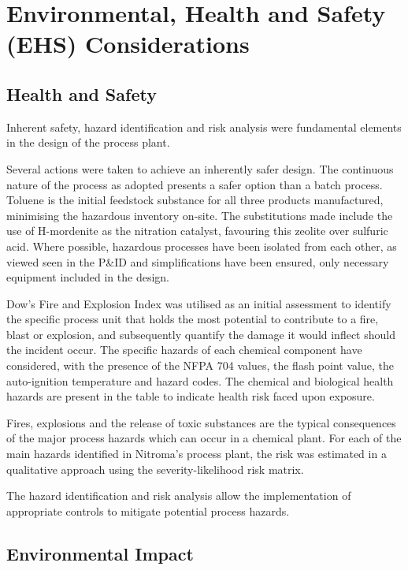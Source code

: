 \section{Environmental, Health and Safety (EHS) Considerations}
\label{sec:ehs}
\subsection{Health and Safety}

Inherent safety, hazard identification and risk analysis were fundamental elements in the design of the process plant. 

Several actions were taken to achieve an inherently safer design. The continuous nature of the process as adopted presents a safer option than a batch process. Toluene is the initial feedstock substance for all three products manufactured, minimising the hazardous inventory on-site. The substitutions made include the use of H-mordenite as the nitration catalyst, favouring this zeolite over sulfuric acid. Where possible, hazardous processes have been isolated from each other, as viewed seen in the P&ID and simplifications have been ensured, only necessary equipment included in the design. 

Dow's Fire and Explosion Index was utilised as an initial assessment to identify the specific process unit that holds the most potential to contribute to a fire, blast or explosion, and subsequently quantify the damage it would inflect should the incident occur. The specific hazards of each chemical component have considered, with the presence of the NFPA 704 values, the flash point value, the auto-ignition temperature and hazard codes. The chemical and biological health hazards are present in the table to indicate health risk faced upon exposure.  

Fires, explosions and the release of toxic substances are the typical consequences of the major process hazards which can occur in a chemical plant. For each of the main hazards identified in Nitroma's process plant, the risk was estimated in a qualitative approach using the severity-likelihood risk matrix. 

The hazard identification and risk analysis allow the implementation of appropriate controls to mitigate potential process hazards. 


\subsection{Environmental Impact}
